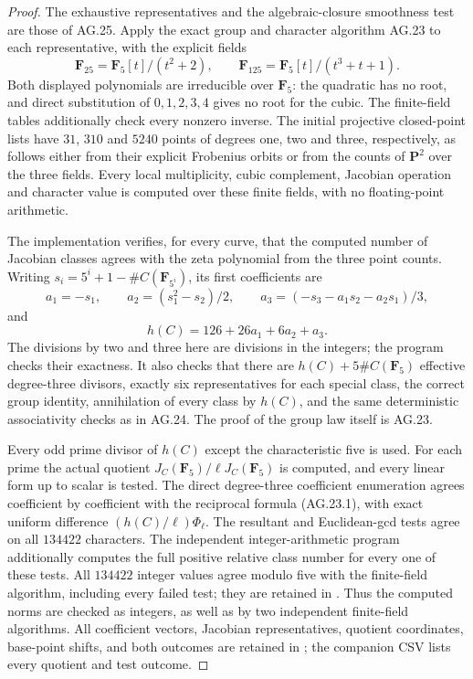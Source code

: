 \begin{proof}
The exhaustive representatives and the algebraic-closure
smoothness test are those of AG.25. Apply the exact group
and character algorithm AG.23 to each representative,
with the explicit fields
\[
 \mathbf F_{25}=\mathbf F_5[t]/(t^2+2),\qquad
 \mathbf F_{125}=\mathbf F_5[t]/(t^3+t+1).
\]
Both displayed polynomials are irreducible over
$\mathbf F_5$: the quadratic has no root, and direct
substitution of $0,1,2,3,4$ gives no root for the cubic.
The finite-field tables additionally check every nonzero
inverse. The initial projective closed-point lists have
$31$, $310$ and $5240$ points of degrees one, two and three,
respectively, as follows either from their explicit Frobenius
orbits or from the counts of $\mathbf P^2$ over the three
fields. Every local multiplicity, cubic complement,
Jacobian operation and character value is computed over
these finite fields, with no floating-point arithmetic.

The implementation verifies, for every curve, that the
computed number of Jacobian classes agrees with the zeta
polynomial from the three point counts. Writing
$s_i=5^i+1-\#C(\mathbf F_{5^i})$, its first coefficients
are
\[
 a_1=-s_1,\qquad
 a_2=(s_1^2-s_2)/2,\qquad
 a_3=(-s_3-a_1s_2-a_2s_1)/3,
\]
and
\[
                   h(C)=126+26a_1+6a_2+a_3.
\]
The divisions by two and three here are divisions in the
integers; the program checks their exactness. It also checks
that there are $h(C)+5\#C(\mathbf F_5)$ effective
degree-three divisors, exactly six representatives for each
special class, the correct group identity, annihilation of
every class by $h(C)$, and the same deterministic
associativity checks as in AG.24. The proof of the group
law itself is AG.23.

Every odd prime divisor of $h(C)$ except the characteristic
five is used. For each prime the actual quotient
$J_C(\mathbf F_5)/\ell J_C(\mathbf F_5)$ is computed,
and every linear form up to scalar is tested. The direct
degree-three coefficient enumeration agrees coefficient by
coefficient with the reciprocal formula (AG.23.1), with
exact uniform difference $(h(C)/\ell)\Phi_\ell$.
The resultant and Euclidean-gcd tests agree on all
$134422$ characters. The independent integer-arithmetic
program  additionally
computes the full positive relative class number for every
one of these tests. All $134422$ integer values agree
modulo five with the finite-field algorithm, including every
failed test; they are retained in
. Thus the
computed norms are checked as integers, as well as by
two independent finite-field algorithms.
All coefficient vectors, Jacobian
representatives, quotient coordinates, base-point shifts,
and both outcomes are retained in
; the companion
CSV lists every quotient and test outcome.


\end{proof}
